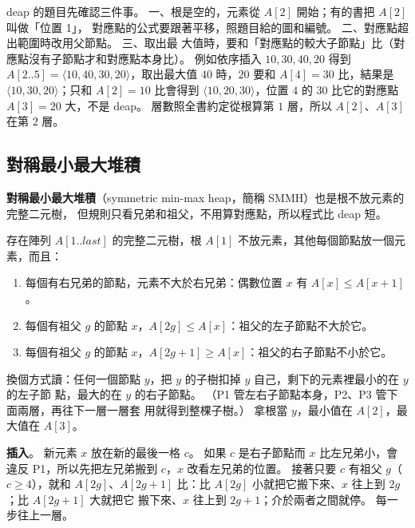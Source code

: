 \begin{examnote}
deap 的題目先確認三件事。 一、根是空的，元素從 $A[2]$ 開始；有的書把 $A[2]$ 叫做「位置 1」，
對應點的公式要跟著平移，照題目給的圖和編號。 二、對應點超出範圍時改用父節點。 三、取出最
大值時，要和「對應點的較大子節點」比（對應點沒有子節點才和對應點本身比）。 例如依序插入
$10, 30, 40, 20$ 得到 $A[2..5] = \langle 10, 40, 30, 20 \rangle$，取出最大值 $40$ 時，$20$ 要和
$A[4] = 30$ 比，結果是 $\langle 10, 30, 20 \rangle$；只和 $A[2] = 10$ 比會得到
$\langle 10, 20, 30 \rangle$，位置 $4$ 的 $30$ 比它的對應點 $A[3] = 20$ 大，不是 deap。
層數照全書約定從根算第 $1$ 層，所以 $A[2]$、$A[3]$ 在第 $2$ 層。
\end{examnote}

\subsection{對稱最小最大堆積}
\label{sec:hp-smmh}

\textbf{對稱最小最大堆積}（symmetric min-max heap，簡稱 SMMH）也是根不放元素的完整二元樹，
但規則只看兄弟和祖父，不用算對應點，所以程式比 deap 短。

\begin{definition}[對稱最小最大堆積]
\label{def:hp-smmh}
存在陣列 $A[1..\mathit{last}]$ 的完整二元樹，根 $A[1]$ 不放元素，其他每個節點放一個元素，而且：
\begin{enumerate}
\item[P1.] 每個有右兄弟的節點，元素不大於右兄弟：偶數位置 $x$ 有 $A[x] \le A[x + 1]$。
\item[P2.] 每個有祖父 $g$ 的節點 $x$，$A[2g] \le A[x]$：祖父的左子節點不大於它。
\item[P3.] 每個有祖父 $g$ 的節點 $x$，$A[2g + 1] \ge A[x]$：祖父的右子節點不小於它。
\end{enumerate}
\end{definition}

換個方式讀：任何一個節點 $y$，把 $y$ 的子樹扣掉 $y$ 自己，剩下的元素裡最小的在 $y$ 的左子節
點，最大的在 $y$ 的右子節點。 （P1 管左右子節點本身，P2、P3 管下面兩層，再往下一層一層套
用就得到整棵子樹。） 拿根當 $y$，最小值在 $A[2]$，最大值在 $A[3]$。

\textbf{插入}。 新元素 $x$ 放在新的最後一格 $c$。 如果 $c$ 是右子節點而 $x$ 比左兄弟小，會違反
P1，所以先把左兄弟搬到 $c$，$x$ 改看左兄弟的位置。 接著只要 $c$ 有祖父 $g$（$c \ge 4$），就和
$A[2g]$、$A[2g + 1]$ 比：比 $A[2g]$ 小就把它搬下來、$x$ 往上到 $2g$；比 $A[2g + 1]$ 大就把它
搬下來、$x$ 往上到 $2g + 1$；介於兩者之間就停。 每一步往上一層。

